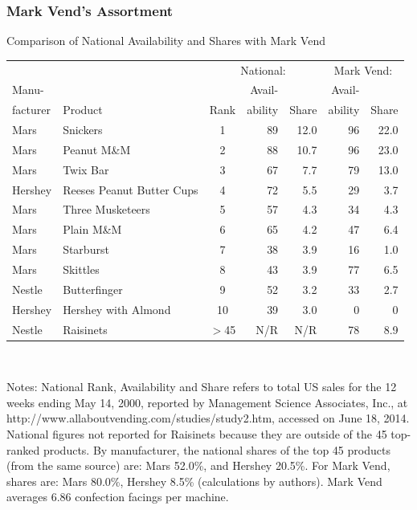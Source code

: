 \begin{frame}
\frametitle{Mark Vend's Assortment}
\begin{center}
\vspace{-0.3in}
\scriptsize
Comparison of National Availability and Shares with Mark Vend
\begin{tabular}{|l|l|c|r|r|r|r|}
\hline
&&\multicolumn{3}{c|}{National:}&\multicolumn{2}{c|}{Mark Vend:} \\
Manu-& &&Avail-&& Avail- &  \\
facturer&Product &Rank&ability&Share& ability & Share \\
\hline \hline 
Mars& Snickers &1&89&12.0&96&22.0\\
Mars& Peanut M\&M&2&88&10.7&96&23.0\\
Mars& Twix Bar&3&67 &7.7&79&13.0\\
Hershey& Reeses Peanut Butter Cups &4&72&5.5& 29&3.7\\
Mars& Three Musketeers &5&57&4.3& 34&4.3\\
Mars& Plain M\&M  &6&65&4.2& 47&6.4\\
Mars& Starburst &7&38&3.9& 16&1.0\\
Mars& Skittles &8&43&3.9& 77&6.5\\
Nestle& Butterfinger &9&52&3.2& 33&2.7 \\
Hershey & Hershey with Almond &10&39&3.0&  0&0\\
Nestle& Raisinets &$>$45 &N/R &N/R& 78& 8.9\\
\hline
\end{tabular}\\
\end{center}
\begin{spacing}{0}
\tiny Notes: National Rank, Availability and Share refers to total US sales for the 12 weeks ending May 14, 2000, reported by Management Science Associates, Inc., at http://www.allaboutvending.com/studies/study2.htm, accessed on June 18, 2014.  National figures not reported for Raisinets because they are outside of the 45 top-ranked products.  By manufacturer, the national shares of the top 45 products (from the same source) are: Mars 52.0\%, and Hershey 20.5\%.  For Mark Vend, shares are: Mars 80.0\%, Hershey 8.5\% (calculations by authors).  Mark Vend averages 6.86 confection facings per machine.
\end{spacing}
\end{frame}

